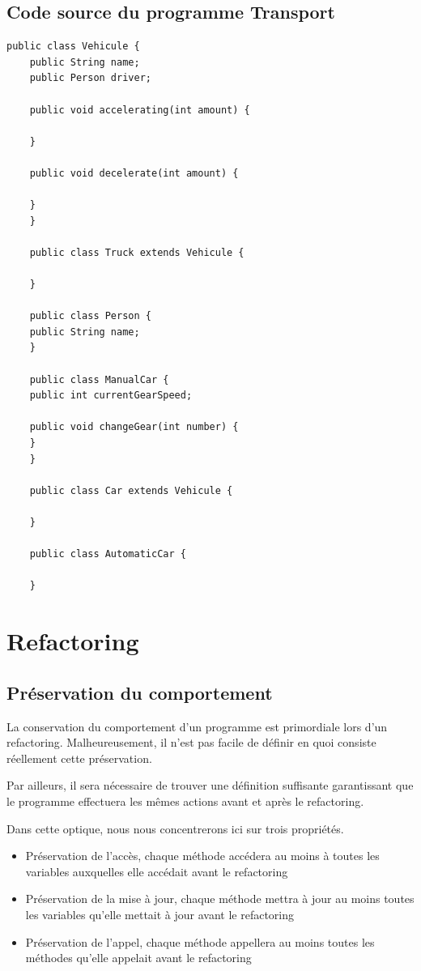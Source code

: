 \documentclass[a4paper, 12pt]{article}
\begin{document}
  \subsection{Code source du programme Transport}

  \begin{lstlisting}[frame=single]
    public class Vehicule {
    public String name;
    public Person driver;

    public void accelerating(int amount) {

    }

    public void decelerate(int amount) {

    }
    }

    public class Truck extends Vehicule {

    }

    public class Person {
    public String name;
    }

    public class ManualCar {
    public int currentGearSpeed;

    public void changeGear(int number) {
    }
    }

    public class Car extends Vehicule {

    }

    public class AutomaticCar {

    }
  \end{lstlisting}

  \newpage
  \section{Refactoring}

  \subsection{Préservation du comportement}
  \label{subsec:preservationDuComportement}

  La conservation du comportement d'un programme est primordiale lors d'un refactoring.
  Malheureusement, il n'est pas facile de définir en quoi consiste réellement cette préservation.

  Par ailleurs, il sera nécessaire de trouver une définition suffisante garantissant que le programme effectuera les mêmes actions avant et après le refactoring.

  Dans cette optique, nous nous concentrerons ici sur trois propriétés.

  \begin{itemize}[label=\textbullet]
    \item Préservation de l'accès, chaque méthode accédera au moins à toutes les variables auxquelles elle accédait avant le refactoring
    \item Préservation de la mise à jour, chaque méthode mettra à jour au moins toutes les variables qu'elle mettait à jour avant le refactoring
    \item Préservation de l'appel, chaque méthode appellera au moins toutes les méthodes qu'elle appelait avant le refactoring
  \end{itemize}
\end{document}
